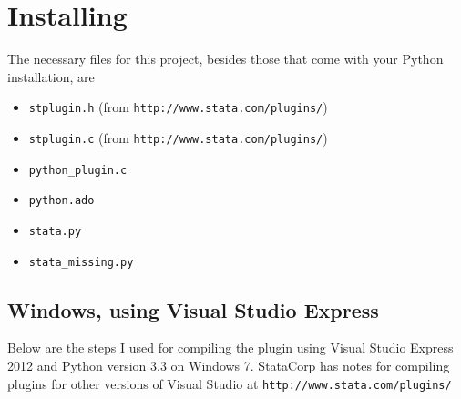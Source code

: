 \documentclass{article}
\begin{document}
\section{Installing} \label{installing}
				
		The necessary files for this project, besides those that come with your Python installation, are
		\begin{itemize}
			\item \lstinline$stplugin.h$ (from \verb|http://www.stata.com/plugins/|)
			\item \lstinline$stplugin.c$ (from \verb|http://www.stata.com/plugins/|)
			\item \lstinline$python_plugin.c$
			\item \lstinline$python.ado$
			\item \lstinline$stata.py$
			\item \lstinline$stata_missing.py$
		\end{itemize}
		
	\subsection{Windows, using Visual Studio Express}
	
	Below are the steps I used for compiling the plugin using Visual Studio Express 2012 and Python version 3.3 on Windows 7. StataCorp has notes for compiling plugins for other versions of Visual Studio at \verb|http://www.stata.com/plugins/|
	
\end{document}
